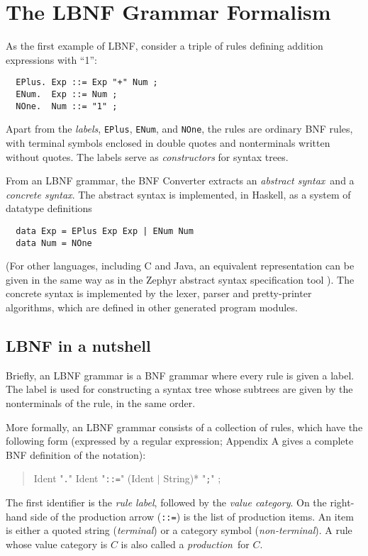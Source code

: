\documentclass[10pt]{article}
\newcommand{\bequ}{\begin{quote}}
\newcommand{\enqu}{\end{quote}}
\begin{document}
\section{The LBNF Grammar Formalism}

As the first example of LBNF, 
consider a triple of rules defining addition expressions with ``1'':
\begin{verbatim}
  EPlus. Exp ::= Exp "+" Num ;
  ENum.  Exp ::= Num ;
  NOne.  Num ::= "1" ;
\end{verbatim}
Apart from the \textit{labels}, {\tt EPlus}, {\tt ENum}, and {\tt NOne}, 
the rules are
ordinary BNF rules, with terminal symbols enclosed in
double quotes and nonterminals written without quotes.
The labels serve as \textit{constructors} for
syntax trees.

From an LBNF grammar, the BNF Converter extracts 
an \textit{abstract syntax}\ and  
a \textit{concrete syntax}.
The abstract syntax is implemented, in Haskell, as a system of
datatype definitions
\begin{verbatim}
  data Exp = EPlus Exp Exp | ENum Num
  data Num = NOne
\end{verbatim}
(For other languages, including C and Java, an equivalent
representation can be given in the same way as in the Zephyr
abstract syntax specification tool \cite{zephyr}).
The concrete syntax is implemented by the
lexer, parser and pretty-printer algorithms,
which are defined in other generated program modules.



\subsection{LBNF in a nutshell}

Briefly, an LBNF grammar is a BNF grammar where every rule is given a label.
The label is used for constructing a syntax tree whose subtrees are
given by the nonterminals of the rule, in the same order.

More formally, an LBNF grammar consists of a collection of rules, 
which have the following form (expressed by a regular expression;
Appendix A gives a complete BNF definition of the notation):
\bequ
  Ident "{\tt .}" Ident "{\tt ::=}" (Ident $\mid$ String)* "{\tt;}" ;
\enqu
The first identifier is the \textit{rule label}, followed by the
\textit{value category}. On the right-hand side of the production
arrow ({\tt ::=}) is the list of production items. An item is either
a quoted string (\textit{terminal}) or a category symbol (\textit{non-terminal}).
A rule whose value category is $C$ is also called a \textit{production}\ for $C$.
\end{document}
